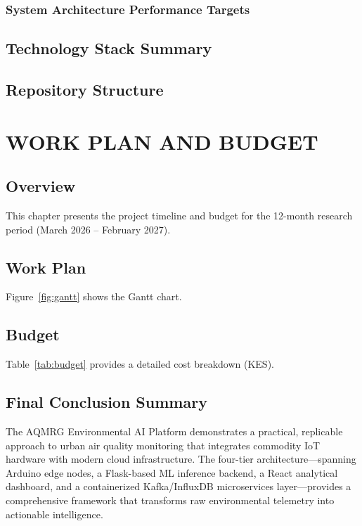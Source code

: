 \subsection{System Architecture Performance Targets}

\tabExpectedOutcomesSysperf

\section{Technology Stack Summary}

\tabExpectedOutcomesTechStack

\section{Repository Structure}

\figExpectedOutcomesRepo

\chapter{WORK PLAN AND BUDGET}

\section{Overview}
This chapter presents the project timeline and budget for the 12-month research period (March 2026 -- February 2027).

\section{Work Plan}
Figure~\ref{fig:gantt} shows the Gantt chart.

\figWorkplanBudgetGantt

\section{Budget}
Table~\ref{tab:budget} provides a detailed cost breakdown (KES).

\tabWorkplanBudgetBudget



\section{Final Conclusion Summary}

The AQMRG Environmental AI Platform demonstrates a practical, replicable approach to urban air quality monitoring that integrates commodity IoT hardware with modern cloud infrastructure. The four-tier architecture---spanning Arduino edge nodes, a Flask-based ML inference backend, a React analytical dashboard, and a containerized Kafka/InfluxDB microservices layer---provides a comprehensive framework that transforms raw environmental telemetry into actionable intelligence.

